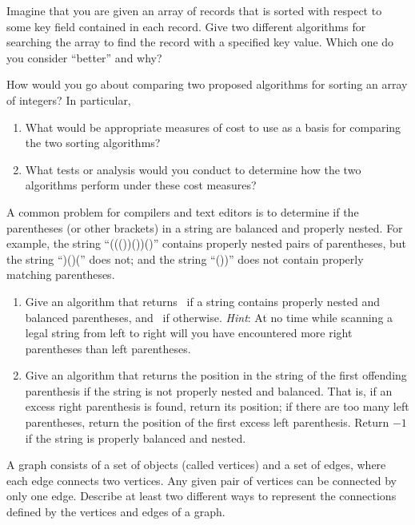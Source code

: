 \begin{exercises}
\item
Imagine that you are given an array of records that is sorted with
respect to some key field contained in each record.
Give two different algorithms for searching the array to find the
record with a specified key value.
Which one do you consider ``better'' and why?

\item
How would you go about comparing two proposed algorithms for sorting
an array of integers?
In particular,
\begin{enumerate}
\item
What would be appropriate measures of cost to use as a basis for
comparing the two sorting algorithms?
\item
What tests or analysis would you conduct to determine how the two
algorithms perform under these cost measures?
\end{enumerate}

\item
{}
A common problem for compilers and text editors is to determine if the
parentheses (or other brackets) in a string are balanced and properly
nested.
For example, the string ``((())())()'' contains properly nested pairs of
parentheses, but the string ``)()('' does not; and the string ``())''
does not contain properly matching parentheses.

\begin{enumerate}
\item
Give an algorithm that returns \TRUE\ if a string contains
properly nested and balanced parentheses, and \FALSE\ if otherwise.
\emph{Hint}: At no time while scanning a legal string from left to
right will you have encountered more right parentheses than left
parentheses.

\item
Give an algorithm that returns the position in the string of
the first offending parenthesis if the string is not properly nested
and balanced.
That is, if an excess right parenthesis is found, return its position;
if there are too many left parentheses, return the position of the
first excess left parenthesis.
Return \(-1\) if the string is properly balanced and nested.
\end{enumerate}

\item
A graph consists of a set of objects (called vertices)
and a set of edges, where each edge connects two vertices.
Any given pair of vertices can be connected by only one edge.
Describe at least two different ways to represent the connections
defined by the vertices and edges of a graph.


\end{exercises}
